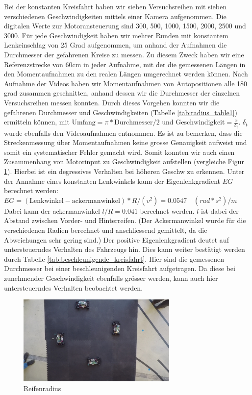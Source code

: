 \documentclass[10pt]{article}
\begin{document}
    Bei der konstanten Kreisfahrt haben wir sieben Versuchsreihen mit sieben verschiedenen Geschwindigkeiten mittels einer Kamera aufgenommen.
    Die digitalen Werte zur Motoransteuerung sind 300, 500, 1000, 1500, 2000, 2500 und 3000.
    Für jede Geschwindigkeit haben wir mehrer Runden mit konstantem Lenkeinschlag von 25 Grad aufgenommen, um anhand der Aufnahmen die Durchmesser der gefahrenen Kreise zu messen.
    Zu diesem Zweck haben wir eine Referenzstrecke von 60cm in jeder Aufnahme, mit der die gemessenen Längen in den Momentaufnahmen zu den
    realen Längen umgerechnet werden können. Nach Aufnahme der Videos haben wir Momentaufnahmen von Autopositionen alle 180 grad zusammen geschnitten,
    anhand dessen wir die Durchmesser der einzelnen Versuchsreihen messen konnten. Durch dieses Vorgehen konnten wir die gefahrenen Durchmesser und Geschwindigkeiten (Tabelle \ref{tab:radius_table1}) ermitteln können, mit $\text{Umfang} = \pi*\text{Durchmesser}/2$ und $\text{Geschwindigkeit} = \frac{x}{\delta_t}$. $\delta_t$ wurde ebenfalls den Videoaufnahmen entnommen.
    Es ist zu bemerken, dass die Streckenmessung über Momentaufnahmen keine grosse Genauigkeit aufweist und somit ein systematischer Fehler gemacht wird.
    Somit konnten wir auch einen Zusammenhang von Motorinput zu Geschwindigkeit aufstellen (vergleiche Figur \ref{fig:reifenradius}). Hierbei ist ein degressives Verhalten bei höheren Geschw zu erkennen.
    Unter der Annahme eines konstanten Lenkwinkels kann der Eigenlenkgradient $EG$ berechnet werden:
    $EG=(\text{Lenkwinkel}-\text{ackermanwinkel})*R/(v^2)=0.0547\quad (rad*s^2)/m$
    Dabei kann der ackermanwinkel  $l/R = 0.041$ berechnet werden. $l$ ist dabei der Abstand zwischen Vorder- und Hinterreifen.
    (Der Ackermanwinkel wurde für die verschiedenen Radien berechnet und anschliessend gemittelt, da die Abweichungen sehr gering sind.)
    Der positive Eigenlenkgradient deutet auf untersteuerndes Verhalten des Fahrzeugs hin. Dies kann weiter bestätigt werden durch Tabelle \ref{tab:beschleunigende_kreisfahrt}.
    Hier sind die gemessenen Durchmesser bei einer beschleunigenden Kreisfahrt aufgetragen. Da diese bei zunehmender Geschwindigkeit ebenfalls grösser werden, kann auch hier untersteuerndes Verhalten beobachtet werden.


\begin{figure}[hbtp]
        \centering
        \includegraphics[width=0.7\textwidth]{Dyn_Kreis_5678}
        \caption{Reifenradius}
        \label{fig:reifenradius}
    \end{figure}
\end{document}
